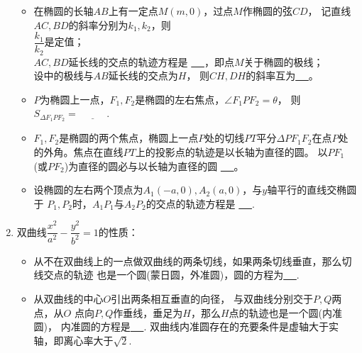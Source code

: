 \documentclass{article}
\newif\ifte
\begin{document}
\begin{multicols}{2}
\begin{enumerate}[leftmargin=20pt]
\begin{itemize}[leftmargin=-4pt]
\item 在椭圆的长轴$ AB $上有一定点$ M(m,0) $，过点$ M $作椭圆的弦$ CD $，
记直线$ AC,BD $的斜率分别为$ k_{1},k_{2} $，则 \\
 $ \dfrac{k_{1}}{k_{2}} $是定值；\\
  $ AC,BD $延长线的交点的轨迹方程是
\underline{\ \ifte $ x=\dfrac{a^2}{m} $
    \else \hspace{1.5cm} \fi\ }，即点$ M $关于椭圆的极线；\\
 设中的极线与$ AB $延长线的交点为$ H $，
    则$ CH, DH $的斜率互为\underline{\ \ifte 相反数
        \else \hspace{2cm} \fi\ }。

\item $P$为椭圆上一点，$F_1,F_2$是椭圆的左右焦点，$\angle F_1PF_2=\theta $，
则 $ S_{\Delta F_1PF_2}=\underline{\ \ifte b^{2}\tan\dfrac{\theta}{2}
    \else \hspace{1cm} \fi\ } $. 
   
\item $ F_1,F_2 $是椭圆的两个焦点，椭圆上一点$ P $处的切线$ PT $平分$ \Delta
PF_1F_2 $在点$ P $处的外角。焦点在直线$ PT $上的投影点的轨迹是以长轴为直径的圆。
以$ PF_1 $(或$ PF_2 $)为直径的圆必与以长轴为直径的圆
\underline{\ \ifte 内切\else \hspace{1cm} \fi\ }。

\item 设椭圆的左右两个顶点为$ A_1(-a,0),A_2(a,0) $，与$ y $轴平行的直线交椭圆于
$ P_1,P_2 $时，$ A_1P_1 $与$ A_2P_2 $的交点的轨迹方程是
\underline{\ \ifte $ \dfrac{x^2}{a^2}-\dfrac{y^2}{b^2}=1 $
    \else \hspace{2cm} \fi\ }.    

\end{itemize}

\item 双曲线$ \dfrac{x^2}{a^2}-\dfrac{y^2}{b^2}=1 $的性质：
\begin{itemize}[leftmargin=-4pt]
\item 从不在双曲线上的一点做双曲线的两条切线，如果两条切线垂直，那么切线交点的轨迹
也是一个圆(蒙日圆，外准圆)，圆的方程为\underline{\ \ifte 
    $ x^2+y^2=|a^2-b^2| $ \else \hspace{2cm} \fi\ }.

\item 从双曲线的中心$ O $引出两条相互垂直的向径，
与双曲线分别交于$ P,Q $两点，从$ O $
点向$ P,Q $作垂线，垂足为$ H $，那么$ H $点的轨迹也是一个圆(内准圆)，
内准圆的方程是\underline{\ \ifte $ x^2+y^2=\dfrac{a^2b^2}{b^2-a^2} $
    \else \hspace{2cm} \fi\ }.
双曲线内准圆存在的充要条件是虚轴大于实轴，即离心率大于$ \sqrt{2} $.


\end{itemize}
\end{enumerate}
\end{multicols}
\end{document}
